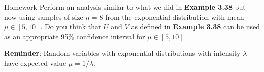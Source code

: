 \documentclass[8pt]{beamer}
\begin{document}
\begin{frame}{Homework}  
Perform an analysis similar to what we did in {\bf Example 3.38} but now using samples of size $n=8$ from the exponential distribution with mean $\mu \in [5,10]$.  Do you think that $U$ and $V$ as defined in \textbf{Example 3.38} can be used as an appropriate 95\% confidence interval for $\mu \in [5,10]$

\vspace{3mm}

\textbf{Reminder}: Random variables with exponential distributions with intensity $\lambda$ have expected value $\mu=1/\lambda$.
\end{frame}
\end{document}
